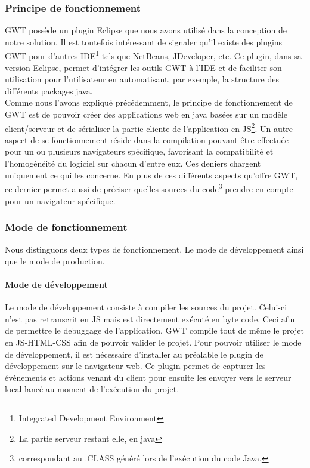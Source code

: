 \subsubsection{Principe de fonctionnement}

GWT possède un plugin Eclipse que nous avons utilisé dans la conception de notre solution. Il est toutefois intéressant de signaler qu'il existe des plugins GWT pour d'autres IDE\footnote{Integrated Development Environment} tels que NetBeans, JDeveloper, etc. 
Ce plugin, dans sa version Eclipse, permet d'intégrer les outils GWT à l'IDE et de faciliter son utilisation pour l'utilisateur en automatisant, par exemple, la structure des différents packages java.\\
\newline
\indent
Comme nous l'avons expliqué précédemment, le principe de fonctionnement de GWT est de pouvoir créer des applications web en java basées sur un modèle client/serveur et de sérialiser la partie cliente de l'application en JS\footnote{La partie serveur restant elle, en java}. Un autre aspect de se fonctionnement réside dans la compilation pouvant être effectuée pour un ou plusieurs navigateurs spécifique, favorisant la compatibilité et l'homogénéité du logiciel sur chacun d'entre eux. Ces deniers chargent uniquement ce qui les concerne. En plus de ces différents aspects qu'offre GWT, ce dernier permet aussi de préciser quelles sources du code\footnote{correspondant au .CLASS généré lors de l'exécution du code Java.} prendre en compte pour un navigateur spécifique.

\subsubsection{Mode de fonctionnement}
Nous distinguons deux types de fonctionnement. Le mode de développement ainsi que le mode de production.
	
\paragraph{Mode de développement}
Le mode de développement consiste à compiler les sources du projet. Celui-ci n'est pas retranscrit en JS mais est directement exécuté en byte code. Ceci afin de permettre le debuggage de l'application. GWT compile tout de même le projet en JS-HTML-CSS afin de pouvoir valider le projet.
\newline
\indent
Pour pouvoir utiliser le mode de développement, il est nécessaire d'installer au préalable le plugin de développement sur le navigateur web. Ce plugin permet de capturer les événements et actions venant du client pour ensuite les envoyer vers le serveur local lancé au moment de l'exécution du projet.

